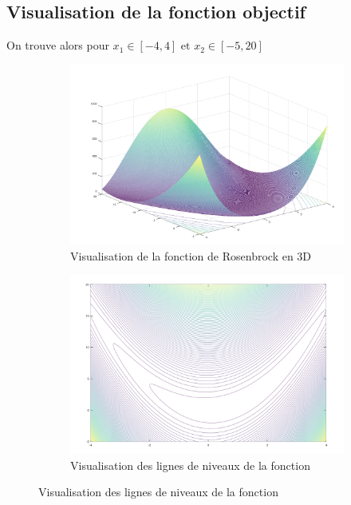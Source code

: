 \documentclass[a4paper, 10pt]{article}
\begin{document}
		\subsection{Visualisation de la fonction objectif}
			On trouve alors pour $x_1 \in \left[ -4, 4 \right] \mbox{ et } x_2 \in \left[ -5, 20 \right]$
			\newline
			\begin{figure}[h]
				\centering
				\begin{subfigure}[h]{0.49\textwidth}
         				\centering
         				\includegraphics[width=\textwidth]{rosenbrock3D}
         				\caption{Visualisation de la fonction de Rosenbrock en 3D}
     				\end{subfigure}
				\begin{subfigure}[h]{0.49\textwidth}
         				\centering
         				\includegraphics[width=\textwidth]{contourRosenbrock}
         				\caption{Visualisation des lignes de niveaux de la fonction}
     				\end{subfigure}
			\end{figure}
			
\end{document}

